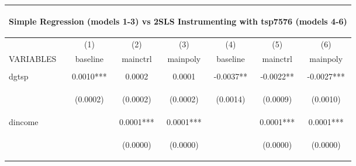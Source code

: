 \begin{center}
\begin{tabular}{lcccccc}
\multicolumn{7}{c}{\begin{large}Simple Regression (models 1-3) vs 2SLS Instrumenting with tsp7576 (models 4-6)\end{large}} \\ \hline
 & (1) & (2) & (3) & (4) & (5) & (6) \\
VARIABLES & baseline & mainctrl & mainpoly & baseline & mainctrl & mainpoly \\ \hline
\vspace{4pt} & \begin{footnotesize}\end{footnotesize} & \begin{footnotesize}\end{footnotesize} & \begin{footnotesize}\end{footnotesize} & \begin{footnotesize}\end{footnotesize} & \begin{footnotesize}\end{footnotesize} & \begin{footnotesize}\end{footnotesize} \\
dgtsp & 0.0010*** & 0.0002 & 0.0001 & -0.0037** & -0.0022** & -0.0027*** \\
\vspace{4pt} & \begin{footnotesize}(0.0002)\end{footnotesize} & \begin{footnotesize}(0.0002)\end{footnotesize} & \begin{footnotesize}(0.0002)\end{footnotesize} & \begin{footnotesize}(0.0014)\end{footnotesize} & \begin{footnotesize}(0.0009)\end{footnotesize} & \begin{footnotesize}(0.0010)\end{footnotesize} \\
dincome &  & 0.0001*** & 0.0001*** &  & 0.0001*** & 0.0001*** \\
\vspace{4pt} & \begin{footnotesize}\end{footnotesize} & \begin{footnotesize}(0.0000)\end{footnotesize} & \begin{footnotesize}(0.0000)\end{footnotesize} & \begin{footnotesize}\end{footnotesize} & \begin{footnotesize}(0.0000)\end{footnotesize} & \begin{footnotesize}(0.0000)\end{footnotesize} \\

\end{tabular}
\end{center}
